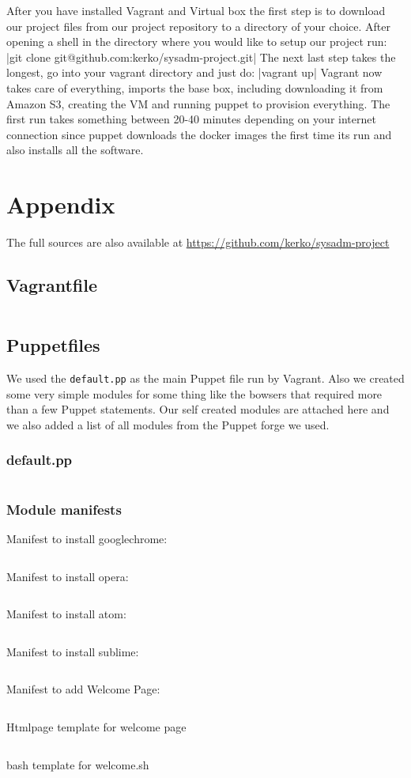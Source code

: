 After you have installed Vagrant and Virtual box the first step is to download our project files from our project repository to a directory of your choice. After opening a shell in the directory where you would like to setup our project run: |git clone git@github.com:kerko/sysadm-project.git|
The next last step takes the longest, go into your vagrant directory and just do: |vagrant up| Vagrant now takes care of everything, imports the base box, including downloading it from Amazon S3, creating the \gls{VM} and running puppet to provision everything. The first run takes something between 20-40 minutes depending on your internet connection since puppet downloads the docker images the first time its run and also installs all the software.




\cleardoublepage{}
\section{Appendix}
The full sources are also available at \url{https://github.com/kerko/sysadm-project}
\subsection{Vagrantfile}
\inputminted[linenos=true]{ruby}{../../Vagrant/Vagrantfile}
\subsection{Puppetfiles}
We used the \verb|default.pp| as the main Puppet file run by Vagrant. Also we created some very simple modules for some thing like the bowsers that required more than a few Puppet statements. Our self created modules are attached here and we also added a list of all modules from the Puppet forge we used.
\subsubsection{default.pp}
\inputminted[linenos=true]{Puppet}{../../Puppet/manifests/default.pp}
\subsubsection{Module manifests}
Manifest to install googlechrome:
\inputminted[linenos=true]{Puppet}{../../Puppet/modules/googlechrome/manifests/init.pp}
Manifest to install opera:
\inputminted[linenos=true]{Puppet}{../../Puppet/modules/opera/manifests/init.pp}
Manifest to install atom:
\inputminted[linenos=true]{Puppet}{../../Puppet/modules/atom/manifests/init.pp}
Manifest to install sublime:
\inputminted[linenos=true]{Puppet}{../../Puppet/modules/sublime/manifests/init.pp}
Manifest to add Welcome Page:
\inputminted[linenos=true]{Puppet}{../../Puppet/modules/welcome/manifests/init.pp}
Htmlpage template for welcome page
\inputminted[linenos=true]{Html}{../../Puppet/modules/welcome/templates/welcomePage.html}
bash template for welcome.sh
\inputminted[linenos=true]{bash}{../../Puppet/modules/welcome/templates/welcomeScript.sh}


